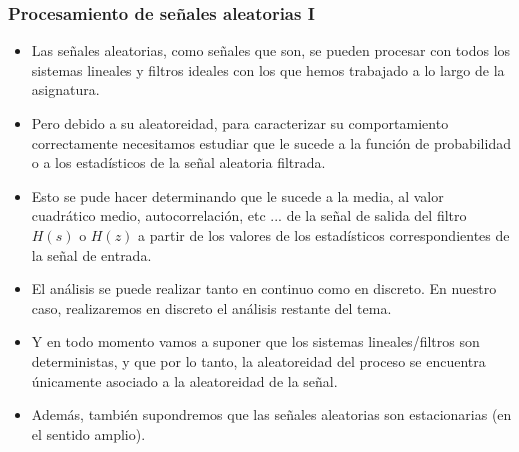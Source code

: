 
\begin{frame}
\frametitle{Procesamiento de señales aleatorias I}
\vspace{-0.2cm}
\footnotesize
\begin{itemize}
\item Las señales aleatorias, como señales que son, se pueden procesar con todos los sistemas lineales y filtros ideales con los que hemos trabajado a lo largo de la asignatura.
\item Pero debido a su aleatoreidad, para caracterizar su comportamiento correctamente necesitamos estudiar que le sucede a la función de probabilidad o a los estadísticos de la señal aleatoria filtrada. 
\item Esto se pude hacer determinando que le sucede a la media, al valor cuadrático medio, autocorrelación, etc ... de la señal de salida del filtro $H(s)$ o $H(z)$ a partir de los valores de los estadísticos correspondientes de la señal de entrada.
\item El análisis se puede realizar tanto en continuo como en discreto. En nuestro caso, realizaremos en discreto el análisis restante del tema.
\item Y en todo momento vamos a suponer que los sistemas lineales/filtros son deterministas, y que por lo tanto, la aleatoreidad del proceso se encuentra únicamente asociado a la aleatoreidad de la señal. 
\item Además, también supondremos que las señales aleatorias son estacionarias (en el sentido amplio).


\end{itemize}
\end{frame}




